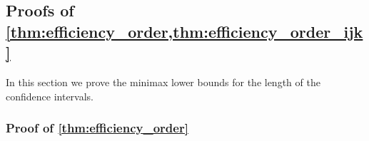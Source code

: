 \documentclass[10pt]{article}
\newcommand{\0}{{\mathbf{0}}}
\newcommand{\1}{{\mathbf{1}}}
\begin{document}
 

 
 



\subsection{Proofs of \cref{thm:efficiency_order,thm:efficiency_order_ijk}} \label{sec:prooforders}
In this section we prove the minimax lower bounds for the length of the confidence intervals.  

\subsubsection{Proof of \cref{thm:efficiency_order}}
\end{document}
